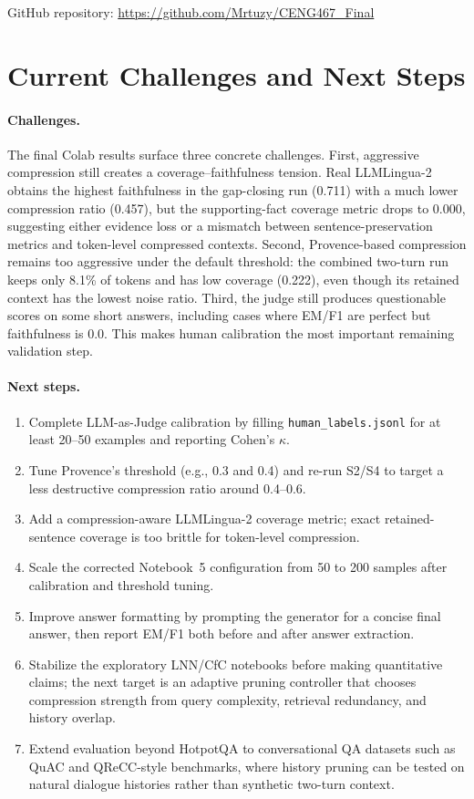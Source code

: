 \documentclass[11pt,a4paper]{article}
\begin{document}
GitHub repository: \url{https://github.com/Mrtuzy/CENG467_Final}


\section{Current Challenges and Next Steps}

\paragraph{Challenges.}
The final Colab results surface three concrete challenges. First, aggressive compression still creates a coverage--faithfulness tension. Real LLMLingua-2 obtains the highest faithfulness in the gap-closing run (0.711) with a much lower compression ratio (0.457), but the supporting-fact coverage metric drops to 0.000, suggesting either evidence loss or a mismatch between sentence-preservation metrics and token-level compressed contexts. Second, Provence-based compression remains too aggressive under the default threshold: the combined two-turn run keeps only 8.1\% of tokens and has low coverage (0.222), even though its retained context has the lowest noise ratio. Third, the judge still produces questionable scores on some short answers, including cases where EM/F1 are perfect but faithfulness is 0.0. This makes human calibration the most important remaining validation step.

\paragraph{Next steps.}
\begin{enumerate}[nosep]
    \item Complete LLM-as-Judge calibration by filling \texttt{human\_labels.jsonl} for at least 20--50 examples and reporting Cohen's $\kappa$.
    \item Tune Provence's threshold (e.g., 0.3 and 0.4) and re-run S2/S4 to target a less destructive compression ratio around 0.4--0.6.
    \item Add a compression-aware LLMLingua-2 coverage metric; exact retained-sentence coverage is too brittle for token-level compression.
    \item Scale the corrected Notebook~5 configuration from 50 to 200 samples after calibration and threshold tuning.
    \item Improve answer formatting by prompting the generator for a concise final answer, then report EM/F1 both before and after answer extraction.
    \item Stabilize the exploratory LNN/CfC notebooks before making quantitative claims; the next target is an adaptive pruning controller that chooses compression strength from query complexity, retrieval redundancy, and history overlap.
    \item Extend evaluation beyond HotpotQA to conversational QA datasets such as QuAC and QReCC-style benchmarks, where history pruning can be tested on natural dialogue histories rather than synthetic two-turn context.
\end{enumerate}
\end{document}
